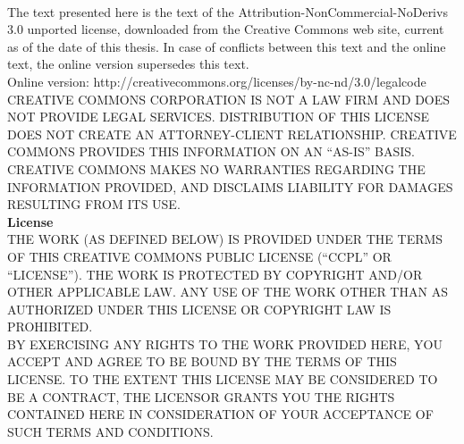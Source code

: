 \clearpage
\thispagestyle{empty}
\setcounter{secnumdepth}{0}
\label{sec:appendixL}
\\

The text presented here is the text of the Attribution-NonCommercial-NoDerivs
3.0 unported license, downloaded from the Creative Commons web site, current as
of the date of this thesis. In case of conflicts between this text and the
online text, the online version supersedes this text. \\

Online version: http://creativecommons.org/licenses/by-nc-nd/3.0/legalcode  \\

CREATIVE COMMONS CORPORATION IS NOT A LAW FIRM AND DOES NOT PROVIDE LEGAL
SERVICES. DISTRIBUTION OF THIS LICENSE DOES NOT CREATE AN ATTORNEY-CLIENT
RELATIONSHIP. CREATIVE COMMONS PROVIDES THIS INFORMATION ON AN ``AS-IS'' BASIS.
CREATIVE COMMONS MAKES NO WARRANTIES REGARDING THE INFORMATION PROVIDED, AND
DISCLAIMS LIABILITY FOR DAMAGES RESULTING FROM ITS USE. \\

\textbf{License} \\

THE WORK (AS DEFINED BELOW) IS PROVIDED UNDER THE TERMS OF THIS CREATIVE COMMONS
PUBLIC LICENSE (``CCPL'' OR ``LICENSE''). THE WORK IS PROTECTED BY COPYRIGHT AND/OR
OTHER APPLICABLE LAW. ANY USE OF THE WORK OTHER THAN AS AUTHORIZED UNDER THIS
LICENSE OR COPYRIGHT LAW IS PROHIBITED.\\

BY EXERCISING ANY RIGHTS TO THE WORK PROVIDED HERE, YOU ACCEPT AND AGREE TO BE
BOUND BY THE TERMS OF THIS LICENSE. TO THE EXTENT THIS LICENSE MAY BE CONSIDERED
TO BE A CONTRACT, THE LICENSOR GRANTS YOU THE RIGHTS CONTAINED HERE IN
CONSIDERATION OF YOUR ACCEPTANCE OF SUCH TERMS AND CONDITIONS.\\

